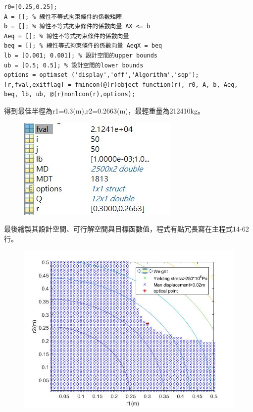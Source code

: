 \documentclass[12pt]{article}
\begin{document}
\begin{CJK}{UTF8}{bkai}
\begin{lstlisting}
r0=[0.25,0.25];
A = []; % 線性不等式拘束條件的係數矩陣
b = []; % 線性不等式拘束條件的係數向量 AX <= b
Aeq = []; % 線性不等式拘束條件的係數向量
beq = []; % 線性等式拘束條件的係數向量 AeqX = beq
lb = [0.001; 0.001]; % 設計空間的upper bounds
ub = [0.5; 0.5]; % 設計空間的lower bounds
options = optimset ('display','off','Algorithm','sqp');
[r,fval,exitflag] = fmincon(@(r)object_function(r), r0, A, b, Aeq, beq, lb, ub, @(r)nonlcon(r),options);
\end{lstlisting}

得到最佳半徑為r1=0.3(m),r2=0.2663(m)，最輕重量為212410kg。\\


\begin{figure}[h]
\includegraphics[scale=1]{./graph/result.jpg}
\end{figure}


最後繪製其設計空間、可行解空間與目標函數值，程式有點冗長寫在主程式14-62行。
\begin{figure}[h]
\includegraphics[scale=0.5]{./graph/space.jpg}
\end{figure}

\clearpage



\end{CJK}
\end{document}
